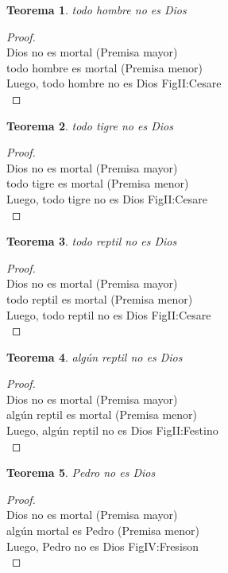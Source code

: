 ﻿\documentclass[12pt]{book}
\newtheorem{theorem}{Teorema}[chapter]
\newtheorem{proof}{Demostración}
\begin{document}
\begin{theorem}
todo hombre no es Dios
\label{th: 107}
\end{theorem}\begin{proof}\\Dios no es mortal	 (Premisa mayor) \\todo hombre es mortal	 (Premisa menor) \\Luego, todo hombre no es Dios	FigII:Cesare \\ \end{proof}
\begin{theorem}
todo tigre no es Dios
\label{th: 108}
\end{theorem}\begin{proof}\\Dios no es mortal	 (Premisa mayor) \\todo tigre es mortal	 (Premisa menor) \\Luego, todo tigre no es Dios	FigII:Cesare \\ \end{proof}
\begin{theorem}
todo reptil no es Dios
\label{th: 109}
\end{theorem}\begin{proof}\\Dios no es mortal	 (Premisa mayor) \\todo reptil es mortal	 (Premisa menor) \\Luego, todo reptil no es Dios	FigII:Cesare \\ \end{proof}
\begin{theorem}
algún reptil no es Dios
\label{th: 110}
\end{theorem}\begin{proof}\\Dios no es mortal	 (Premisa mayor) \\algún reptil es mortal	 (Premisa menor) \\Luego, algún reptil no es Dios	FigII:Festino \\ \end{proof}
\begin{theorem}
Pedro no es Dios
\label{th: 111}
\end{theorem}\begin{proof}\\Dios no es mortal	 (Premisa mayor) \\algún mortal es Pedro	 (Premisa menor) \\Luego, Pedro no es Dios	FigIV:Fresison \\ \end{proof}
\end{document}
